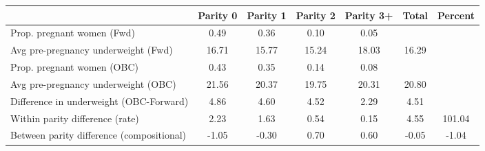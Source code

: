 \begin{tabular}{l*{6}{c}}
\toprule
            &\multicolumn{1}{c}{Parity 0}&\multicolumn{1}{c}{Parity 1}&\multicolumn{1}{c}{Parity 2}&\multicolumn{1}{c}{Parity 3+}&\multicolumn{1}{c}{Total}&\multicolumn{1}{c}{Percent}\\
\midrule
\midrule
Prop. pregnant women (Fwd)&        0.49&        0.36&        0.10&        0.05&            &            \\
Avg pre-pregnancy underweight (Fwd)&       16.71&       15.77&       15.24&       18.03&       16.29&            \\
Prop. pregnant women (OBC)&        0.43&        0.35&        0.14&        0.08&            &            \\
Avg pre-pregnancy underweight (OBC)&       21.56&       20.37&       19.75&       20.31&       20.80&            \\
Difference in underweight (OBC-Forward)&        4.86&        4.60&        4.52&        2.29&        4.51&            \\
Within parity difference (rate)&        2.23&        1.63&        0.54&        0.15&        4.55&      101.04\\
Between parity difference (compositional)&       -1.05&       -0.30&        0.70&        0.60&       -0.05&       -1.04\\
\bottomrule
\end{tabular}
